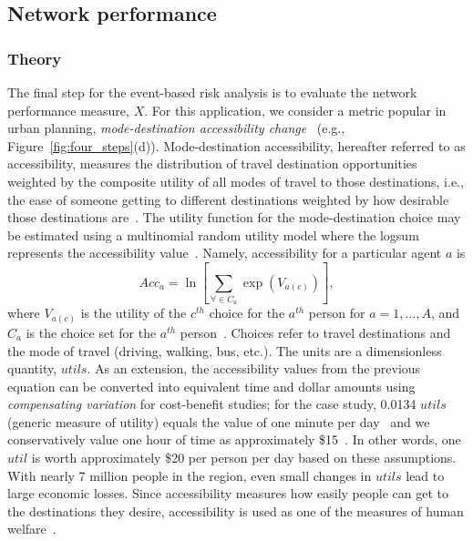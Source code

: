 \subsection{Network performance}
\subsubsection{Theory}
The final step for the event-based risk analysis is to evaluate the network performance measure, $X$. For this application, we consider a metric popular in urban planning, \emph{mode-destination accessibility change}~\cite[e.g.,][]{geurs_accessibility_2004,kockelman_travel_1997,vasconcellos_rural_1997,waddell_incorporating_2002}  (e.g., Figure~\ref{fig:four_steps}{(d)}). Mode-destination accessibility, hereafter referred to as accessibility, measures the distribution of travel destination opportunities weighted by the composite utility of all modes of travel to those destinations, i.e., the ease of someone getting to different destinations weighted by how desirable those destinations are~\cite{handy_measuring_1997,niemeier_accessibility:_1997,small_urban_1992}. The utility function for the mode-destination choice may be estimated using a multinomial random utility model where the logsum represents the accessibility value~\cite{manski_structural_1981,handy_measuring_1997,niemeier_accessibility:_1997}. Namely, accessibility for a particular agent $a$ is
\begin{equation}
Acc_a = \ln \left[ \sum_{\forall \in C_a} \exp (V_{a(c)}) \right],
\label{eq:acc}
\end{equation}
where $V_{a(c)}$ is the utility of the $c^{th}$ choice for the $a^{th}$ person for $a = 1, \ldots, A$, and $C_a$ is the choice set for the $a^{th}$ person~\cite{handy_measuring_1997}. Choices refer to travel destinations and the mode of travel (driving, walking, bus, etc.). The units are a dimensionless quantity, $utils$. As an extension, the accessibility values from the previous equation can be converted into equivalent time and dollar amounts using \emph{compensating variation} for cost-benefit studies; for the case study, 0.0134 $utils$ (generic measure of utility) equals the value of one minute per day~\cite{niemeier_accessibility:_1997,small_applied_1981,ory_personal_2013} and we conservatively value one hour of time as approximately \$15~\cite{united_states_department_of_transportation_revised_2011}. In other words, one $util$ is worth approximately \$20 per person per day based on these assumptions. With nearly 7 million people in the region, even small changes in $utils$ lead to large economic losses. Since accessibility measures how easily people can get to the destinations they desire, accessibility is used as one of the measures of human welfare~\cite[e.g.,][]{niemeier_accessibility:_1997}.

